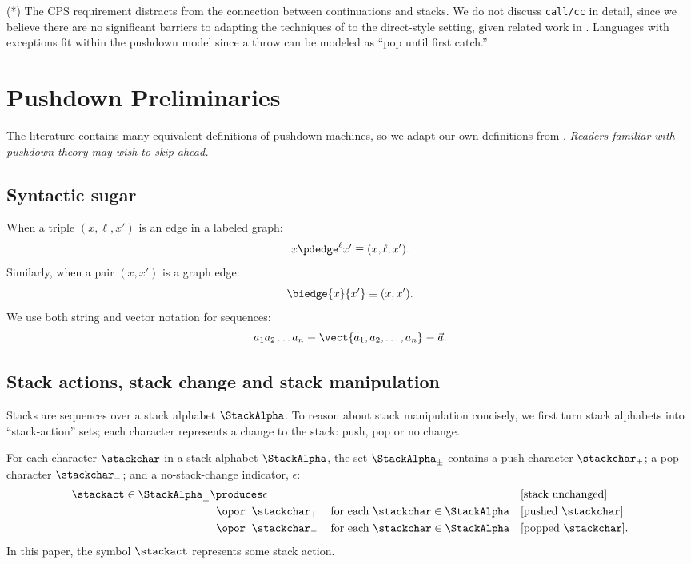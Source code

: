 (*) The CPS requirement distracts from the connection between continuations and stacks.
We do not discuss \texttt{call/cc} in detail, since we believe there are no significant barriers to adapting the techniques of \citet{dvanhorn:Vardoulakis2011Pushdown} to the direct-style setting, given related work in \citet{local:hopa-summaries}.
Languages with exceptions fit within the pushdown model since a throw can be modeled as ``pop until first catch.''


\section{Pushdown Preliminaries}

The literature contains  many equivalent definitions of pushdown machines, so
we adapt our own definitions from \citet{mattmight:Sipser:2005:Theory}.
\emph{Readers familiar with pushdown theory may wish to skip ahead.}



\subsection{Syntactic sugar}

When a triple $(x,\ell,x')$ is an edge in a labeled graph:
\begin{equation*}
x \pdedge^\ell x'  \equiv
(x,\ell,x')
\text.
\end{equation*}
Similarly, when a pair $(x,x')$ is a graph edge:
\begin{equation*}
\biedge{x}{x'} \equiv (x,x')
\text.
\end{equation*}
We use both
string and vector notation for sequences:
\begin{equation*}
a_1 a_2 \ldots a_n \equiv \vect{a_1,a_2,\ldots,a_n}
\equiv
\vec{a} 
\text.
\end{equation*}


\subsection{Stack actions, stack change and stack manipulation}


Stacks are sequences over a stack alphabet $\StackAlpha$.
To reason about stack manipulation concisely,
we first turn stack alphabets into ``stack-action'' sets;
each character represents a change to the stack: push, pop or no
change.

For each character $\stackchar$ in a stack alphabet $\StackAlpha$, the
 set $\StackAlpha_\pm$ contains a push character
$\stackchar_{+}$; a pop character $\stackchar_{-}$;
and a no-stack-change indicator, $\epsilon$:
\begin{align*}
\stackact \in \StackAlpha_\pm &\produces \epsilon && \text{[stack unchanged]} 
\\
    &\;\;\opor\;\; \stackchar_{+}  \;\;\;\text{ for each } \stackchar \in \StackAlpha && \text{[pushed $\stackchar$]}
    \\
      &\;\;\opor\;\; \stackchar_{-}  \;\;\;\text{ for each } \stackchar \in \StackAlpha && \text{[popped $\stackchar$]}
      \text.
\end{align*}
In this paper, the symbol $\stackact$ represents some stack action.


